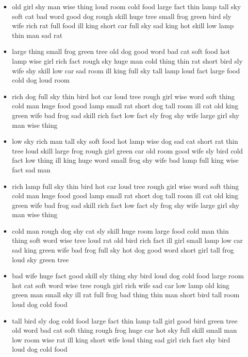 \documentclass[10pt,letterpaper]{article}
\begin{document}
\begin{itemize}
  \item old girl shy man wise thing loud room cold food large fact
    thin lamp tall sky soft cat bad word good dog rough skill huge
    tree small frog green bird sly wife rich rat full food ill king
    short car full sky sad king hot skill low lamp thin man sad rat

  \item large thing small frog green tree old dog good word bad cat
    soft food hot lamp wise girl rich fact rough sky huge man cold
    thing thin rat short bird sly wife shy skill low car sad room ill
    king full sky tall lamp loud fact large food cold dog loud room
  
  \item rich dog full sky thin bird hot car loud tree rough girl wise
    word soft thing cold man huge food good lamp small rat short dog
    tall room ill cat old king green wife bad frog sad skill rich fact
    low fact sly frog shy wife large girl shy man wise thing

  \item low sky rich man tall sky soft food hot lamp wise dog sad cat
    short rat thin tree loud skill large frog rough girl green car old
    room good wife sly bird cold fact low thing ill king huge word
    small frog shy wife bad lamp full king wise fact sad man

  \item rich lamp full sky thin bird hot car loud tree rough girl wise
    word soft thing cold man huge food good lamp small rat short dog
    tall room ill cat old king green wife bad frog sad skill rich fact
    low fact sly frog shy wife large girl shy man wise thing

  \item cold man rough dog shy cat sly skill huge room large food cold
    man thin thing soft word wise tree loud rat old bird rich fact ill
    girl small lamp low car sad king green wife bad frog full sky hot
    dog good word short girl tall frog loud sky green tree

  \item bad wife huge fact good skill sly thing shy bird loud dog cold
    food large room hot cat soft word wise tree rough girl rich wife
    sad car low lamp old king green man small sky ill rat full frog
    bad thing thin man short bird tall room loud dog cold food

  \item \color{red}tall bird sly dog cold food large fact thin lamp tall girl
    good bird green tree old word bad cat soft thing rough frog huge
    car hot sky full skill small man low room wise rat ill king short
    wife loud thing sad girl rich fact shy bird loud dog cold food\color{black}


\end{itemize}
\end{document}
